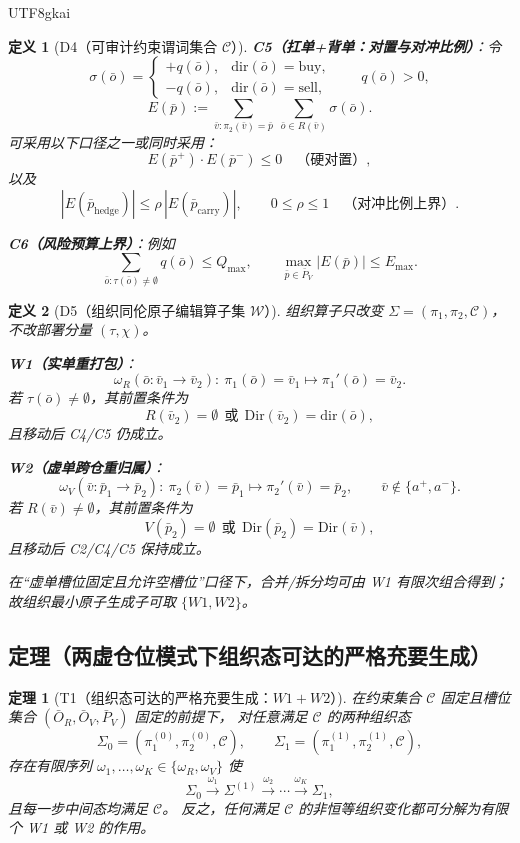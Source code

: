\documentclass[12pt]{article}
\newtheorem{definition}{定义}[section]
\newtheorem{theorem}{定理}[section]
\begin{document}
\begin{CJK*}{UTF8}{gkai}
\begin{definition}[D4（可审计约束谓词集合 $\mathcal C$）]
\textbf{C5（扛单+背单：对置与对冲比例）}：令
\[
  \sigma(\bar o)=
  \begin{cases}
    +q(\bar o), & \mathrm{dir}(\bar o)=\mathrm{buy},\\
    -q(\bar o), & \mathrm{dir}(\bar o)=\mathrm{sell},
  \end{cases}
  \qquad q(\bar o)>0,
\]
\[
  E(\bar p):=
  \sum_{\bar v:\pi_2(\bar v)=\bar p}\ \sum_{\bar o\in R(\bar v)}\sigma(\bar o).
\]
可采用以下口径之一或同时采用：
\[
  E(\bar p^+)\cdot E(\bar p^-)\le 0
  \quad\text{（硬对置）},
\]
以及
\[
  |E(\bar p_{\mathrm{hedge}})|\le \rho\,|E(\bar p_{\mathrm{carry}})|,\qquad 0\le\rho\le 1
  \quad\text{（对冲比例上界）}.
\]

\textbf{C6（风险预算上界）}：例如
\[
  \sum_{\bar o:\tau(\bar o)\neq\emptyset}q(\bar o)\le Q_{\max},
  \qquad
  \max_{\bar p\in\bar P_V}|E(\bar p)|\le E_{\max}.
\]
\end{definition}

\begin{definition}[D5（组织同伦原子编辑算子集 $\mathcal W$）]
\label{def:tex28-ch19-d5}
组织算子只改变 $\Sigma=(\pi_1,\pi_2,\mathcal C)$，不改部署分量 $(\tau,\chi)$。

\textbf{W1（实单重打包）}：
\[
  \omega_R(\bar o:\bar v_1\to\bar v_2):\
  \pi_1(\bar o)=\bar v_1\mapsto \pi_1'(\bar o)=\bar v_2.
\]
若 $\tau(\bar o)\neq\emptyset$，其前置条件为
\[
  R(\bar v_2)=\emptyset\ \ \text{或}\ \ \mathrm{Dir}(\bar v_2)=\mathrm{dir}(\bar o),
\]
且移动后 C4/C5 仍成立。

\textbf{W2（虚单跨仓重归属）}：
\[
  \omega_V(\bar v:\bar p_1\to\bar p_2):\
  \pi_2(\bar v)=\bar p_1\mapsto \pi_2'(\bar v)=\bar p_2,\qquad
  \bar v\notin\{a^+,a^-\}.
\]
若 $R(\bar v)\neq\emptyset$，其前置条件为
\[
  V(\bar p_2)=\emptyset\ \ \text{或}\ \ \mathrm{Dir}(\bar p_2)=\mathrm{Dir}(\bar v),
\]
且移动后 C2/C4/C5 保持成立。

在“虚单槽位固定且允许空槽位”口径下，合并/拆分均可由 W1 有限次组合得到；
故组织最小原子生成子可取 $\{W1,W2\}$。
\end{definition}

\subsection{定理（两虚仓位模式下组织态可达的严格充要生成）}
\label{subsec:tex28-ch19-thm}

\begin{theorem}[T1（组织态可达的严格充要生成：$W1+W2$）]
\label{thm:tex28-ch19-t1}
在约束集合 $\mathcal C$ 固定且槽位集合 $(\bar O_R,\bar O_V,\bar P_V)$ 固定的前提下，
对任意满足 $\mathcal C$ 的两种组织态
\[
  \Sigma_0=(\pi_1^{(0)},\pi_2^{(0)},\mathcal C),
  \qquad
  \Sigma_1=(\pi_1^{(1)},\pi_2^{(1)},\mathcal C),
\]
存在有限序列 $\omega_1,\dots,\omega_K\in\{\omega_R,\omega_V\}$ 使
\[
  \Sigma_0\xrightarrow{\omega_1}\Sigma^{(1)}\xrightarrow{\omega_2}\cdots\xrightarrow{\omega_K}\Sigma_1,
\]
且每一步中间态均满足 $\mathcal C$。
反之，任何满足 $\mathcal C$ 的非恒等组织变化都可分解为有限个 W1 或 W2 的作用。
\end{theorem}


\end{CJK*}
\end{document}
